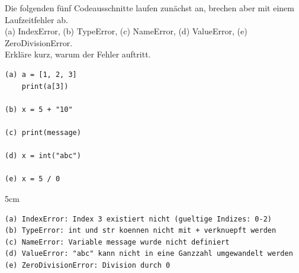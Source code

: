 \question[4]
Die folgenden fünf Codeausschnitte laufen zunächst an, brechen aber mit einem Laufzeitfehler ab. \\
(a) IndexError, (b) TypeError, (c) NameError, (d) ValueError, (e) ZeroDivisionError.  \\
Erkläre kurz, warum der Fehler auftritt.

\begin{lstlisting}
(a) a = [1, 2, 3]
    print(a[3])

(b) x = 5 + "10"

(c) print(message)

(d) x = int("abc")

(e) x = 5 / 0
\end{lstlisting}

\begin{solutionbox}{5cm}
\begin{lstlisting}[language={}]
(a) IndexError: Index 3 existiert nicht (gueltige Indizes: 0-2)
(b) TypeError: int und str koennen nicht mit + verknuepft werden
(c) NameError: Variable message wurde nicht definiert
(d) ValueError: "abc" kann nicht in eine Ganzzahl umgewandelt werden
(e) ZeroDivisionError: Division durch 0
\end{lstlisting}
\end{solutionbox}